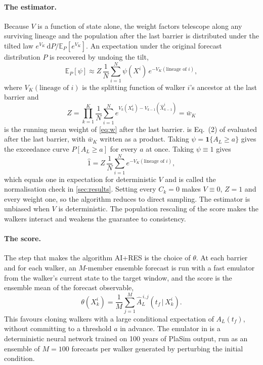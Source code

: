 \documentclass[10pt,twocolumn]{article}
\newcommand{\AL}{A_L}
\newcommand{\vk}{V_k}
\newcommand{\ck}{C_k}
\begin{document}
\paragraph{The estimator.}
Because $V$ is a function of state alone, the weight factors telescope along any surviving lineage and the population after the last barrier is distributed under the tilted law $e^{V_K}\,\mathrm{d}P / \mathbb{E}_P[e^{V_K}]$. An expectation under the original forecast distribution $P$ is recovered by undoing the tilt,
\begin{equation}
  \mathbb{E}_P[\psi] \approx Z\,\frac{1}{N}\sum_{i=1}^{N}\psi(X^i)\,e^{-V_K(\text{lineage of } i)},
  \label{eq:est}
\end{equation}
where $V_K(\text{lineage of } i)$ is the splitting function of walker $i$'s ancestor at the last barrier and
\begin{equation}
  Z = \prod_{k=1}^{K}\frac{1}{N}\sum_{i=1}^{N} e^{\vk(X^i_k)-V_{k-1}(\hat X^i_{k-1})} = \bar w_K
  \label{eq:Z}
\end{equation}
is the running mean weight of \cref{eq:w} after the last barrier.  is Eq.~(2) of \citet{lancelin2026airres} evaluated after the last barrier, with $\bar w_K$ written as a product. Taking $\psi = \mathbf{1}\{\AL \ge a\}$ gives the exceedance curve $P[\AL \ge a]$ for every $a$ at once. Taking $\psi \equiv 1$ gives
\begin{equation}
  \hat 1 = Z\,\frac{1}{N}\sum_{i=1}^{N} e^{-V_K(\text{lineage of } i)},
  \label{eq:norm}
\end{equation}
which equals one in expectation for deterministic $V$ and is called the normalisation check in \cref{sec:results}. Setting every $\ck = 0$ makes $V \equiv 0$, $Z = 1$ and every weight one, so the algorithm reduces to direct sampling. The estimator is unbiased when $V$ is deterministic. The population rescaling of the score makes the walkers interact and weakens the guarantee to consistency.

\paragraph{The score.}
The step that makes the algorithm AI+RES is the choice of $\theta$. At each barrier and for each walker, an $M$-member ensemble forecast is run with a fast emulator from the walker's current state to the target window, and the score is the ensemble mean of the forecast observable,
\begin{equation}
  \theta(X^i_k) = \frac{1}{M}\sum_{j=1}^{M}\hat A^{\,i,j}_L(t_f \,|\, X^i_k).
  \label{eq:theta}
\end{equation}
This favours cloning walkers with a large conditional expectation of $\AL(t_f)$, without committing to a threshold $a$ in advance. The emulator in \citet{lancelin2026airres} is a deterministic neural network trained on 100 years of PlaSim output, run as an ensemble of $M = 100$ forecasts per walker generated by perturbing the initial condition.
\end{document}
